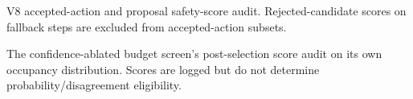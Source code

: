 \documentclass[10pt]{article}
\providecommand{\budgetshieldpath}{generated-budget-shield-v8}
\begin{document}
\begin{landscape}
\begin{table}[p]
\centering\resizebox{\linewidth}{!}{}
\caption{V8 accepted-action and proposal safety-score audit. Rejected-candidate scores on fallback steps are excluded from accepted-action subsets.}
\label{tab:v8-calibration}
\end{table}

\begin{table}[p]
\centering\resizebox{\linewidth}{!}{}
\caption{The confidence-ablated budget screen's post-selection score audit on its own occupancy distribution. Scores are logged but do not determine probability/disagreement eligibility.}
\label{tab:v8-ablation-calibration}
\end{table}
\end{landscape}

\clearpage
\end{document}
